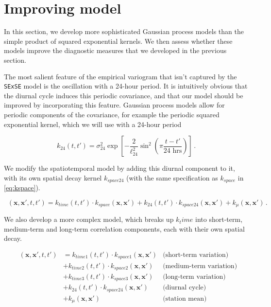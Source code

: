 \documentclass[letter]{article}
\newcommand{\genericdel}[3]{%
      \left#1#3\right#2
    }
\newcommand{\del}[1]{\genericdel(){#1}}
\newcommand{\sbr}[1]{\genericdel[]{#1}}
\newcommand{\xvec}{\mathbold{x}}
\DeclareMathOperator{\kdiurn}{k_{\mathtt{SESE_24}}}
\DeclareMathOperator{\ksumprod}{k_{\mathtt{sumprod}}}
\begin{document}
    	\section{Improving model}\label{improving-model}

In this section, we develop more sophisticated Gaussian process models
than the simple product of squared exponential kernels. We then assess
whether these models improve the diagnostic measures that we developed
in the previous section.

The most salient feature of the empirical variogram that isn't captured
by the \texttt{SExSE} model is the oscillation with a 24-hour period. It
is intuitively obvious that the diurnal cycle induces this periodic
covariance, and that our model should be improved by incorporating this
feature. Gaussian process models allow for periodic components of the
covariance, for example the periodic squared exponential kernel, which
we will use with a 24-hour period

\begin{equation}
    k_{24}(t,t') = \sigma_{24}^2 \exp\sbr{ - \frac{2}{\ell_{24}^2} \sin^2\del{
        \pi \frac{t-t'}{\text{24 hrs}} 
        }}\,.
\end{equation}

We modify the spatiotemporal model by adding this diurnal component to
it, with its own spatial decay kernel \(k_{space24}\) (with the same
specification as \(k_{space}\) in \eqref{eq:kspace}).

\begin{equation}
    \kdiurn(\xvec,\xvec',t,t') = k_{time}(t,t') \cdot k_{space}(\xvec, \xvec') 
        + k_{24}(t,t') \cdot k_{space24}(\xvec, \xvec')
        + k_\mu(\xvec, \xvec') 
        \,.
\end{equation}
    


    	We also develop a more complex model, which breaks up \(k_time\) into
short-term, medium-term and long-term correlation components, each with
their own spatial decay.

\begin{equation}
\begin{aligned}
    \ksumprod(\xvec,\xvec',t,t') &= 
           k_{time1}(t,t') \cdot k_{space1}(\xvec, \xvec')  &\text{(short-term variation)} \\
        &+ k_{time2}(t,t') \cdot k_{space2}(\xvec, \xvec')  &\text{(medium-term variation)} \\
        &+ k_{time3}(t,t') \cdot k_{space3}(\xvec, \xvec')  &\text{(long-term variation)} \\
        &+ k_{24}(t,t') \cdot k_{space24}(\xvec, \xvec') &\text{(diurnal cycle)} \\
        &+ k_\mu(\xvec, \xvec') &\text{(station mean)}
\end{aligned}
\end{equation}
\end{document}
